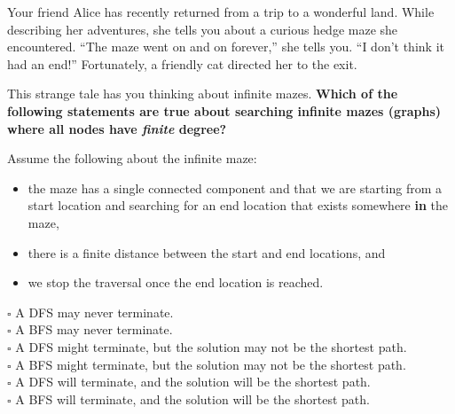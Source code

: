 \documentclass[12pt]{exam}
\newcommand{\stars}[1]{%
    \foreach \n in {1,...,#1}{%
        $\filledstar$%
    }%
}
\begin{document}
\begin{questions}

    \clearpage

    \question[10] [W2/3, \stars{2}] Your friend Alice has recently returned from a trip to a wonderful land. While describing her adventures, she tells you about a curious hedge maze she encountered. ``The maze went on and on forever,'' she tells you. ``I don't think it had an end!'' Fortunately, a friendly cat directed her to the exit.

    This strange tale has you thinking about infinite mazes. \textbf{Which of the following statements are true about searching infinite mazes (graphs) where all nodes have \textit{finite} degree?}

    Assume the following about the infinite maze:
    \begin{itemize}
        \item the maze has a single connected component and that we are starting from a start location and searching for an end location that exists somewhere \textbf{in} the maze,
        \item there is a finite distance between the start and end locations, and
        \item we stop the traversal once the end location is reached.
    \end{itemize}

    $\square$ A DFS may never terminate. \\
    $\square$ A BFS may never terminate. \\
    $\square$ A DFS might terminate, but the solution may not be the shortest path. \\
    $\square$ A BFS might terminate, but the solution may not be the shortest path. \\
    $\square$ A DFS will terminate, and the solution will be the shortest path. \\
    $\square$ A BFS will terminate, and the solution will be the shortest path. \\


\end{questions}
\end{document}
